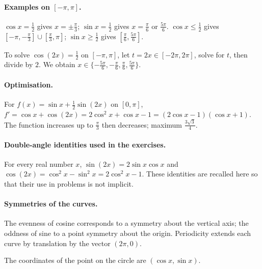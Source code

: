 \paragraph{Examples on $[-\pi,\pi]$.} $\cos x=\frac{1}{2}$ gives $x=\pm\frac{\pi}{3}$; $\sin x=\frac{1}{2}$ gives $x=\frac{\pi}{6}$ or $\frac{5\pi}{6}$. $\cos x\le\frac{1}{2}$ gives $[-\pi,-\frac{\pi}{3}]\cup[\frac{\pi}{3},\pi]$; $\sin x\ge\frac{1}{2}$ gives $[\frac{\pi}{6},\frac{5\pi}{6}]$.
\begin{method}
To solve $\cos (2x)=\frac{1}{2}$ on $[-\pi,\pi]$, let $t=2x\in[-2\pi,2\pi]$, solve for $t$, then divide by $2$. We obtain $x\in\{-\frac{5\pi}{6},-\frac{\pi}{6},\frac{\pi}{6},\frac{5\pi}{6}\}$.
\end{method}
\paragraph{Optimisation.} For $f(x)=\sin x+\frac12\sin(2x)$ on $[0,\pi]$, $f'=\cos x+\cos(2x)=2\cos^2x+\cos x-1=(2\cos x-1)(\cos x+1)$. The function increases up to $\frac{\pi}{3}$ then decreases; maximum $\frac{3\sqrt{3}}{4}$.
\paragraph{Double-angle identities used in the exercises.} For every real number $x$, $\sin(2x)=2\sin x\cos x$ and $\cos(2x)=\cos^2x-\sin^2x=2\cos^2x-1$. These identities are recalled here so that their use in problems is not implicit.
\paragraph{Symmetries of the curves.} The evenness of cosine corresponds to a symmetry about the vertical axis; the oddness of sine to a point symmetry about the origin. Periodicity extends each curve by translation by the vector $(2\pi,0)$.


\begin{center}\par\small The coordinates of the point on the circle are $(\cos x,\sin x)$.\end{center}


